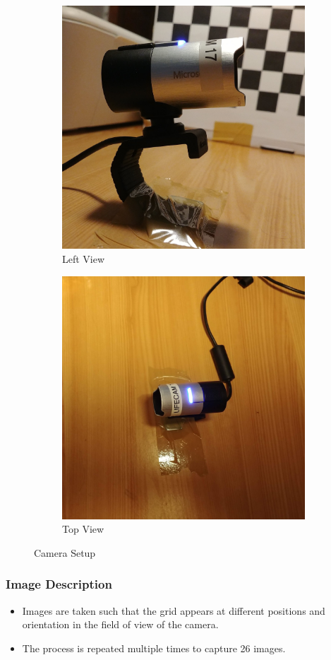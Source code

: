 \documentclass[10pt,a4paper]{article}
\begin{document}
\begin{figure}[H]
\begin{subfigure}{0.5\textwidth}
						\centering
						\includegraphics[width=0.8\linewidth]{images/left_cam.jpg}
						\caption{Left View}
						\label{fig:lview}
					\end{subfigure}
					\begin{subfigure}{0.5\textwidth}
						\centering
						\includegraphics[width=0.8\linewidth]{images/top_cam.jpg}
						\caption{Top View}
						\label{fig:tview}
					\end{subfigure}
					\caption{Camera Setup}
					\label{fig:CamSetup}
				\end{figure}
			\subsubsection{Image Description}
				\begin{itemize}
					\item Images are taken such that the grid appears at different positions and orientation in the field of view of the camera.
					\item The process is repeated multiple times to capture 26 images.
				\end{itemize}			
\end{document}
